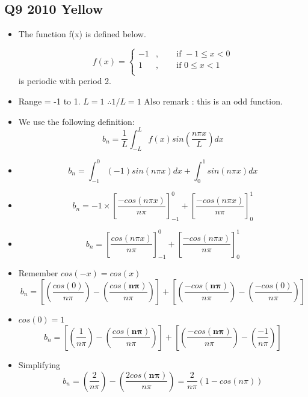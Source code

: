 \documentclass[11pt,a4paper,titlepage,oneside,openany]{article}
\numberwithin{equation}{section}
\numberwithin{algorithm}{section}
\numberwithin{figure}{section}
\numberwithin{table}{section}
\begin{document}
\subsection*{Q9 2010 Yellow}
\Large{
\begin{itemize}
\item The function f(x) is defined below.

\begin{equation*}
        f(x)=\begin{cases}
          -1 &,\qquad \text{if  } -1 \leq x <0 \\
          1 &,\qquad \text{if  } 0 \leq x <1 \\
        \end{cases}
\end{equation*}
is periodic with period 2.
\item Range = -1 to 1. $L=1$ $\therefore 1/L = 1$ Also remark : this is an odd function.
\item We use the following definition: \[ b_n = \frac{1}{L}\int^{L}_{-L} f(x) sin(\frac{n\pi x}{L}) dx \]
\item \[ b_n = \int^{0}_{-1} (-1) sin(n\pi x) dx + \int^{1}_{0}  sin(n\pi x) dx \]

\item \[ b_n = -1 \times \left[ \frac{-cos(n\pi x)}{n\pi } \right]^{0}_{-1}  +  \left[  \frac{-cos(n\pi x)}{n\pi } \right] ^{1}_{0} \]
\item \[ b_n =  \left[ \frac{cos(n\pi x)}{n\pi } \right]^{0}_{-1}  +  \left[  \frac{-cos(n\pi x)}{n\pi } \right] ^{1}_{0} \]
    
    
\item Remember $cos(-x) = cos(x) $
 \[ b_n = \left[ \left( \frac{cos(0)}{n\pi }\right) - \left(\frac{cos(\boldsymbol{n\pi})}{n\pi }\right) \right] + \left[ \left( \frac{-cos(\boldsymbol{n\pi})}{n\pi }\right) - \left(\frac{-cos(0)}{n\pi }\right) \right] \]
\item $cos(0) = 1$
\[ b_n = \left[ \left( \frac{1}{n\pi}\right) - \left(\frac{cos(\boldsymbol{n\pi})}{n\pi }\right) \right] + \left[ \left( \frac{-cos(\boldsymbol{n\pi})}{n\pi }\right) - \left(\frac{-1}{n\pi }\right) \right] \]
\item Simplifying
\[ b_n =  \left( \frac{2}{n\pi }\right) - \left(\frac{2cos(\boldsymbol{n\pi})}{n\pi }\right)
=   \frac{2}{n\pi } \left( 1-cos(n\pi)\right) \]
\end{itemize}
}
\end{document}
